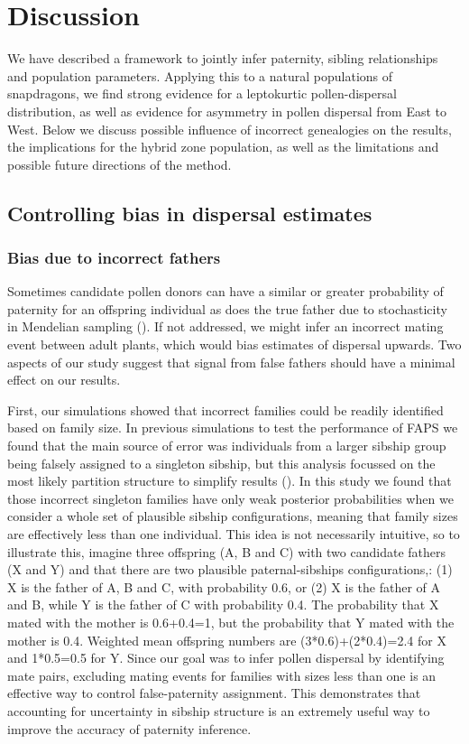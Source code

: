 \documentclass[10pt, a4paper, twocolumn]{article} %
\begin{document}
\section{Discussion}

We have described a framework to jointly infer paternity, sibling relationships and population parameters. 
Applying this to a natural populations of snapdragons, we find strong evidence for a leptokurtic pollen-dispersal distribution, as well as evidence for asymmetry in pollen dispersal from East to West.
Below we discuss possible influence of incorrect genealogies on the results, the implications for the hybrid zone population, as well as the limitations and possible future directions of the method.

\subsection{Controlling bias in dispersal estimates}

\subsubsection{Bias due to incorrect fathers}

Sometimes candidate pollen donors can have a similar or greater probability of paternity for an offspring individual as does the true father due to stochasticity in Mendelian sampling (\cite{thompson1976paradox}).
If not addressed, we might infer an incorrect mating event between adult plants, which would bias estimates of dispersal upwards.
Two aspects of our study suggest that signal from false fathers should have a minimal effect on our results.

First, our simulations showed that incorrect families could be readily identified based on family size.
In previous simulations to test the performance of FAPS we found that the main source of error was individuals from a larger sibship group being falsely assigned to a singleton sibship, but this analysis focussed on the most likely partition structure to simplify results (\cite{ellis2018efficient}).
In this study we found that those incorrect singleton families have only weak posterior probabilities when we consider a whole set of plausible sibship configurations, meaning that family sizes are effectively less than one individual.
This idea is not necessarily intuitive, so to illustrate this, imagine three offspring (A, B and C) with two candidate fathers (X and Y) and that there are two plausible paternal-sibships configurations,: (1) X is the father of A, B and C, with probability 0.6, or (2) X is the father of A and B, while Y is the father of C with probability 0.4.
The probability that X mated with the mother is 0.6+0.4=1, but the probability that Y mated with the mother is 0.4.
Weighted mean offspring numbers are (3*0.6)+(2*0.4)=2.4 for X and 1*0.5=0.5 for Y.
Since our goal was to infer pollen dispersal by identifying mate pairs, excluding mating events for families with sizes less than one is an effective way to control false-paternity assignment.
This demonstrates that accounting for uncertainty in sibship structure is an extremely useful way to improve the accuracy of paternity inference.
\end{document}
